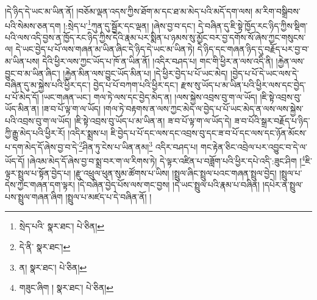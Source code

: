 །དེ་ཉིད་དེ་ཡང་མ་ཡིན་ནོ། །བཅོམ་ལྡན་འདས་ཀྱིས་ཐོག་མ་དང་ཐ་མ་མེད་པའི་མདོ་དག་ལས། མ་རིག་བསྒྲིབས་པའི་སེམས་ཅན་དག །:སྲེད་པ་\footnote{སྲེད་པའི་  སྣར་ཐང་།  པེ་ཅིན། }ཀུན་དུ་སྦྱོར་དང་ལྡན། །ཞེས་བྱ་བ་དང་། དེ་བཞིན་དུ་ཇི་སྟེ་ཁྱོད་རང་ཉིད་ཀྱིས་སྡིག་པའི་ལས་འདི་བྱས་ན་ཁྱོད་རང་ཉིད་ཀྱིས་དེའི་རྣམ་པར་སྨིན་པ་ཉམས་སུ་མྱོང་བར་བྱ་དགོས་སོ་ཞེས་ཀྱང་གསུངས་ལ། དེ་ཡང་བྱེད་པ་པོ་ལས་གཞན་མ་ཡིན་ཞིང་དེ་ཉིད་དེ་ཡང་མ་ཡིན་ཏེ། དེ་ཉིད་དང་གཞན་ཉིད་དུ་བརྗོད་པར་བྱ་བ་མ་ཡིན་པས། དེའི་ཕྱིར་ལས་ཀྱང་ཡོད་པ་ཁོ་ན་ཡིན་ནོ། །འདིར་བཤད་པ། གང་གི་ཕྱིར་ན་ལས་འདི་ནི། །རྐྱེན་ལས་བྱུང་བ་མ་ཡིན་ཞིང་། །རྐྱེན་མིན་ལས་བྱུང་ཡོད་མིན་པ། །དེ་ཕྱིར་བྱེད་པ་པོ་ཡང་མེད། །བྱེད་པ་པོ་དེ་ཡང་ལས་དེ་བཞིན་དུ་མ་སྐྱེས་པའི་ཕྱིར་དང་། བྱེད་པ་པོ་བཀག་པའི་ཕྱིར་དང་། རྫས་སུ་ཡོད་པ་མ་ཡིན་པའི་ཕྱིར་ལས་དང་བྱེད་པ་པོ་མེད་དོ། །ཡང་གཞན་ཡང་། གལ་ཏེ་ལས་དང་བྱེད་མེད་ན། །ལས་སྐྱེས་འབྲས་བུ་ག་ལ་ཡོད། །ཇི་སྟེ་འབྲས་བུ་ཡོད་མིན་ན། །ཟ་བ་པོ་ལྟ་ག་ལ་ཡོད། །གལ་ཏེ་བརྟགས་ན་ལས་ཀྱང་མེད་ལ་བྱེད་པ་པོ་ཡང་མེད་ན་ལས་ལས་སྐྱེས་པའི་འབྲས་བུ་ག་ལ་ཡོད། །ཇི་སྟེ་འབྲས་བུ་ཡོད་པ་མ་ཡིན་ན། ཟ་བ་པོ་ལྟ་ག་ལ་ཡོད་དེ། ཟ་བ་པོའི་སྒྲར་བརྗོད་པ་ཉིད་ཀྱི་རྒྱུ་མེད་པའི་ཕྱིར་རོ། །འདིར་སྨྲས་པ། ཇི་བྱེད་པ་པོ་དང་ལས་དང་འབྲས་བུ་དང་ཟ་བ་པོ་དང་ལས་དང་ཉོན་མོངས་པ་དག་མེད་དོ་ཞེས་བྱ་བ་དེ་\footnote{དེ་ནི་  སྣར་ཐང་། }ཤིན་ཏུ་ངེས་པ་ཡིན་ནམ།\footnote{ན།  སྣར་ཐང་།  པེ་ཅིན། } འདིར་བཤད་པ། གང་རྟེན་ཅིང་འབྲེལ་པར་འབྱུང་བ་དེ་ལ་ཡོད་དོ། །ཞེའམ་མེད་དོ་ཞེས་བྱ་བ་སྨྲ་བར་ག་ལ་རིགས་ཏེ། དེ་ལྟར་འཛིན་པ་བཟློག་པའི་ཕྱིར་དཔེ་འདི་:ཟུང་ཤིག །\footnote{གཟུང་ཞིག །  སྣར་ཐང་།  པེ་ཅིན། }ཇི་ལྟར་སྤྲུལ་པ་སྟོན་བྱེད་པ། །རྫུ་འཕྲུལ་ཕུན་སུམ་ཚོགས་པ་ཡིས། །སྤྲུལ་ཞིང་སྤྲུལ་པའང་གཞན་སྤྲུལ་བྱེད། །སྤྲུལ་པ་དེས་ཀྱང་གཞན་དག་ལྟར། །དེ་བཞིན་བྱེད་པོས་ལས་གང་བྱས། །དེ་ཡང་སྤྲུལ་པའི་རྣམ་པ་བཞིན། །དཔེར་ན་སྤྲུལ་པས་སྤྲུལ་གཞན་ཞིག །སྤྲུལ་པ་མཛད་པ་དེ་བཞིན་ནོ། །
